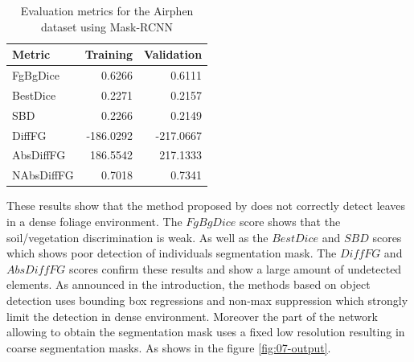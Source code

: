 \documentclass[../thesis.tex]{subfiles}
\begin{document}
    \begin{table}[H]
        \begin{tabularx}{\linewidth}{|X|r|r|}
            \hline
            \textbf{Metric} 	& \textbf{Training} &  \textbf{Validation}  \\ \hline
            FgBgDice 	        &    0.6266 &    0.6111 \\
            BestDice 	        &    0.2271 &    0.2157 \\
            SBD 	            &    0.2266 &    0.2149 \\
            DiffFG 	        	& -186.0292 & -217.0667 \\
            AbsDiffFG       	&  186.5542 &  217.1333 \\ \hline
            NAbsDiffFG       	&    0.7018 &    0.7341 \\ \hline
        \end{tabularx}
        \caption{Evaluation metrics for the Airphen dataset using Mask-RCNN}
        \label{tab:eval-Airphen-rcnn}
    \end{table}
    
    These results show that the method proposed by \cite{ward2020scalable} does not correctly detect leaves in a dense foliage environment. The $FgBgDice$ score shows that the soil/vegetation discrimination is weak. As well as the $BestDice$ and $SBD$ scores which shows poor detection of individuals segmentation mask. The $DiffFG$ and $AbsDiffFG$ scores confirm these results and show a large amount of undetected elements. As announced in the introduction, the methods based on object detection uses bounding box regressions and non-max suppression which strongly limit the detection in dense environment. Moreover the part of the network allowing to obtain the segmentation mask uses a fixed low resolution resulting in coarse segmentation masks. As shows in the figure \ref{fig:07-output}.
    
\end{document}

